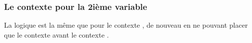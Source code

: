 \documentclass[12pt, a4paper]{article}
\begin{document}

\subsubsection{Le contexte  pour la 2ième variable}

La logique est la même que pour le contexte , de nouveau en ne pouvant placer que le contexte  avant le contexte .
\end{document}
